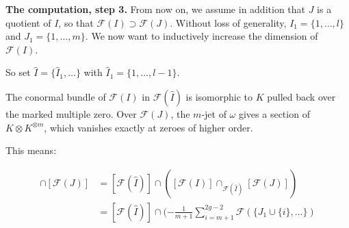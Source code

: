 \noindent \textbf{ The computation, step 3.}
From now on, we assume in addition that $J$ is a quotient of $I$, so that
$\mathcal{F}(I) \supset \mathcal{F}(J)$. Without loss of generality,
$I_1 = \{ 1 , \ldots , l \}$ and $J_1 = \{ 1 , \ldots , m \}$.
We now want to inductively increase the dimension of $\mathcal{F}(I)$.

So set $\hat{I} = \{ \hat{I}_1 , \ldots \}$
with $\hat{I}_1 = \{ 1 , \ldots , l-1\}$.

The conormal bundle of $\mathcal{F}(I)$ in $\mathcal{F}(\hat{I})$ is
isomorphic to $K$ pulled back over the marked multiple zero.
Over $\mathcal{F}(J)$, the $m$-jet of $\omega$ gives a section of
$K \otimes K^{\otimes m}$, which vanishes exactly at zeroes of higher order.

This means:

\begin{align}
  [\mathcal{F}(I)] \cap [\mathcal{F}(J)]
   & = [\mathcal{F}(\hat{I})] \cap 
      ( [\mathcal{F}(I)] \cap_{\mathcal{F}(\hat{I})} [\mathcal{F}(J)] ) \\
   & = [\mathcal{F}(\hat{I})] \cap
      ( - \frac{1}{m+1} \sum_{i=m+1}^{2g-2}
              \mathcal{F}(\{ J_1 \cup \{ i \} , \ldots \} )
\end{align}

